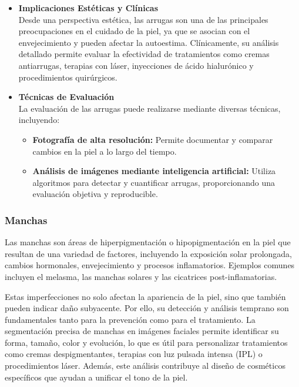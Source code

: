 \begin{itemize}
\begin{itemize}
\end{itemize}
\item \textbf{Implicaciones Estéticas y Clínicas}\\
Desde una perspectiva estética, las arrugas son una de las principales preocupaciones en el cuidado de la piel, ya que se asocian con el envejecimiento y pueden afectar la autoestima. Clínicamente, su análisis detallado permite evaluar la efectividad de tratamientos como cremas antiarrugas, terapias con láser, inyecciones de ácido hialurónico y procedimientos quirúrgicos. \parencite{moon2024dermatology}

\item \textbf{Técnicas de Evaluación}\\
La evaluación de las arrugas puede realizarse mediante diversas técnicas, incluyendo:
\begin{itemize} 
\item \textbf{Fotografía de alta resolución:} Permite documentar y comparar cambios en la piel a lo largo del tiempo. \parencite{yoon2023}

\item \textbf{Análisis de imágenes mediante inteligencia artificial:} Utiliza algoritmos para detectar y cuantificar arrugas, proporcionando una evaluación objetiva y reproducible. \parencite{yoon2023}
\end{itemize}
\end{itemize}

\subsubsection{Manchas}
Las manchas son áreas de hiperpigmentación o hipopigmentación en la piel que resultan de una variedad de factores, incluyendo la exposición solar prolongada, cambios hormonales, envejecimiento y procesos inflamatorios. Ejemplos comunes incluyen el melasma, las manchas solares y las cicatrices post-inflamatorias. \parencite{autor2019manchas}

Estas imperfecciones no solo afectan la apariencia de la piel, sino que también pueden indicar daño subyacente. Por ello, su detección y análisis temprano son fundamentales tanto para la prevención como para el tratamiento. La segmentación precisa de manchas en imágenes faciales permite identificar su forma, tamaño, color y evolución, lo que es útil para personalizar tratamientos como cremas despigmentantes, terapias con luz pulsada intensa (IPL) o procedimientos láser. Además, este análisis contribuye al diseño de cosméticos específicos que ayudan a unificar el tono de la piel. \parencite{autor2019manchas}

